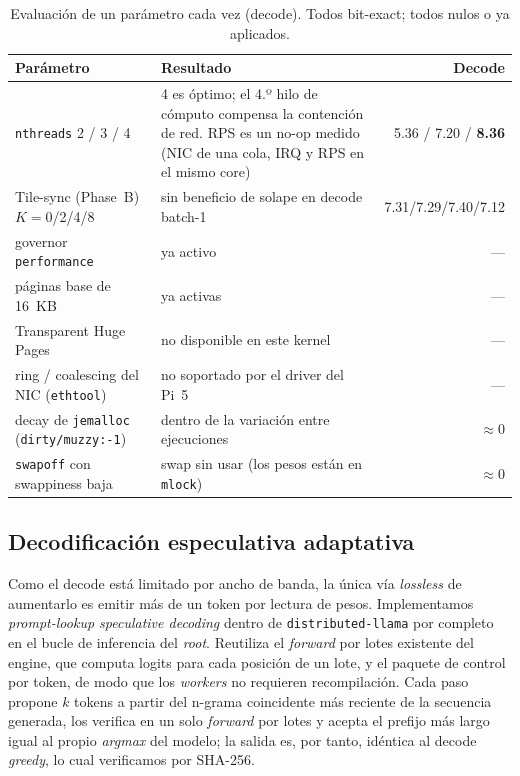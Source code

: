 \documentclass[10pt,a4paper]{article}
\begin{document}
\begin{table}[H]
\centering\small
\caption{Evaluación de un parámetro cada vez (decode). Todos bit-exact; todos nulos o ya aplicados.}
\label{tab:levers}
\begin{tabularx}{\textwidth}{p{4.4cm}X r}
\toprule
\textbf{Parámetro} & \textbf{Resultado} & \textbf{Decode} \\
\midrule
\texttt{nthreads} 2 / 3 / 4 & 4 es óptimo; el 4.º hilo de cómputo compensa la contención de red. RPS es un no-op medido (NIC de una cola, IRQ y RPS en el mismo core) & 5.36 / 7.20 / \textbf{8.36} \\
Tile-sync (Phase~B) $K{=}$0/2/4/8 & sin beneficio de solape en decode batch-1 & 7.31/7.29/7.40/7.12 \\
governor \texttt{performance} & ya activo & --- \\
páginas base de 16~KB & ya activas & --- \\
Transparent Huge Pages & no disponible en este kernel & --- \\
ring / coalescing del NIC (\texttt{ethtool}) & no soportado por el driver del Pi~5 & --- \\
decay de \texttt{jemalloc} (\texttt{dirty/muzzy:-1}) & dentro de la variación entre ejecuciones & $\approx$0 \\
\texttt{swapoff} con swappiness baja & swap sin usar (los pesos están en \texttt{mlock}) & $\approx$0 \\
\bottomrule
\end{tabularx}
\end{table}

\subsection{Decodificación especulativa adaptativa}
\label{sec:spec}
Como el decode está limitado por ancho de banda, la única vía \emph{lossless} de aumentarlo es emitir más de un token por lectura de pesos. Implementamos \emph{prompt-lookup speculative decoding} dentro de \texttt{distributed-llama} por completo en el bucle de inferencia del \emph{root}. Reutiliza el \emph{forward} por lotes existente del engine, que computa logits para cada posición de un lote, y el paquete de control por token, de modo que los \emph{workers} no requieren recompilación. Cada paso propone $k$ tokens a partir del n-grama coincidente más reciente de la secuencia generada, los verifica en un solo \emph{forward} por lotes y acepta el prefijo más largo igual al propio \emph{argmax} del modelo; la salida es, por tanto, idéntica al decode \emph{greedy}, lo cual verificamos por SHA-256.
\end{document}
